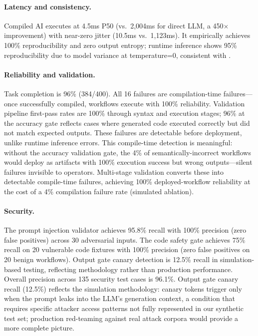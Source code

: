 \documentclass[11pt]{article}
\begin{document}
\paragraph{Latency and consistency.} Compiled AI executes at 4.5ms P50 (vs.\ 2,004ms for direct LLM, a 450$\times$ improvement) with near-zero jitter (10.5ms vs.\ 1,123ms). It empirically achieves 100\% reproducibility and zero output entropy; runtime inference shows 95\% reproducibility due to model variance at temperature=0, consistent with \citet{atil2024nondeterminism}.

\paragraph{Reliability and validation.} Task completion is 96\% (384/400). All 16 failures are compilation-time failures---once successfully compiled, workflows execute with 100\% reliability. Validation pipeline first-pass rates are 100\% through syntax and execution stages; 96\% at the accuracy gate reflects cases where generated code executed correctly but did not match expected outputs. These failures are detectable before deployment, unlike runtime inference errors. This compile-time detection is meaningful: without the accuracy validation gate, the 4\% of semantically-incorrect workflows would deploy as artifacts with 100\% execution success but wrong outputs---silent failures invisible to operators. Multi-stage validation converts these into detectable compile-time failures, achieving 100\% deployed-workflow reliability at the cost of a 4\% compilation failure rate (simulated ablation).

\paragraph{Security.} The prompt injection validator achieves 95.8\% recall with 100\% precision (zero false positives) across 30 adversarial inputs. The code safety gate achieves 75\% recall on 20 vulnerable code fixtures with 100\% precision (zero false positives on 20 benign workflows). Output gate canary detection is 12.5\% recall in simulation-based testing, reflecting methodology rather than production performance. Overall precision across 135 security test cases is 96.1\%. Output gate canary recall (12.5\%) reflects the simulation methodology: canary tokens trigger only when the prompt leaks into the LLM's generation context, a condition that requires specific attacker access patterns not fully represented in our synthetic test set; production red-teaming against real attack corpora would provide a more complete picture.
\end{document}
